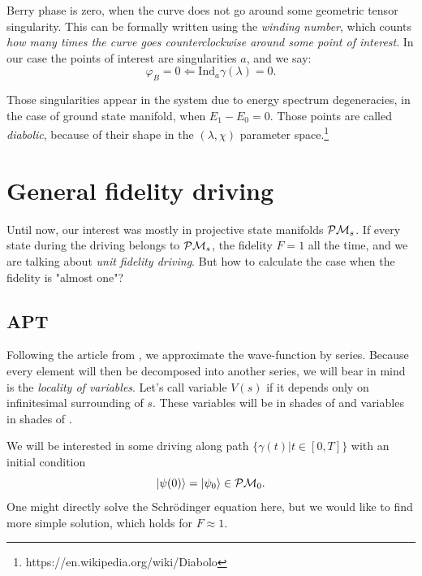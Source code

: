 Berry phase is zero, when the curve does not go around some geometric tensor singularity. This can be formally written using the \emph{winding number}, which counts \emph{how many times the curve goes counterclockwise around some point of interest}. In our case the points of interest are singularities $a$, and we say:
$$\varphi_B=0 \Leftarrow \mathrm{Ind}_a \gamma(\lambda)=0.$$

Those singularities appear in the system due to energy spectrum degeneracies, in the case of ground state manifold, when $E_1-E_0=0$. Those points are called \emph{diabolic}, because of their shape in the $(\lambda,\chi)$ parameter space.\footnote{https://en.wikipedia.org/wiki/Diabolo}









\newpage
\section{General fidelity driving}
Until now, our interest was mostly in projective state manifolds $\mathcal{P}\mathcal{M}_s$. If every state during the driving belongs to $\mathcal{P}\mathcal{M}_s$, the fidelity $F=1$ all the time, and we are talking about \emph{unit fidelity driving}. But how to calculate the case when the fidelity is "almost one"?



\subsection{APT}
Following the article from \cite{Rigolin2008}, we approximate the wave-function by series. Because every element will then be decomposed into another series, we will bear in mind is the \emph{locality of variables}. Let's call variable $V(s)$ \emph{} if it depends only on infinitesimal surrounding of $s$. These variables will be in shades of  and  variables in shades of .

We will be interested in some driving along path $\{\gamma(t)|t\in[0,T]\}$ with an initial condition
\begin{equation}
    \ket{\psi(0)}=\ket{\psi_0}\in \mathcal{P}\mathcal{M}_0.
\end{equation}
One might directly solve the Schr\"odinger equation here, but we would like to find more simple solution, which holds for $F\approx 1$.

